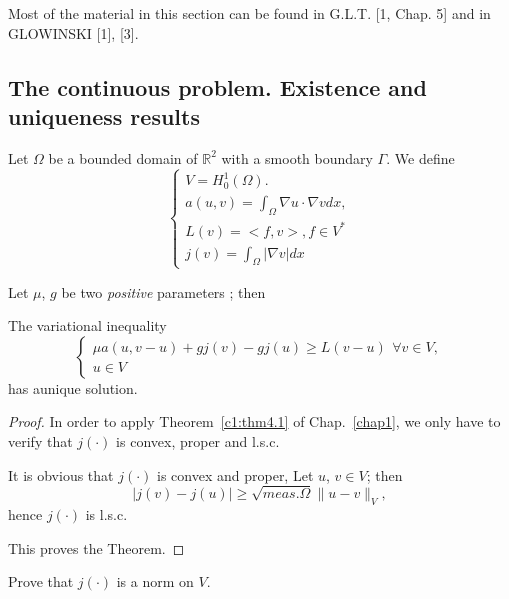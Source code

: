 Most of the material in this section can be found in G.L.T. [1,
  Chap. 5] and in GLOWINSKI [1], [3]. 

\subsection{The continuous problem. Existence and uniqueness
  results}\label{c2:ss6.1}  
Let $\Omega$ be a bounded domain of $\mathbb{R}^2$ with a smooth
boundary $\Gamma$. We define 
\begin{equation*}
\begin{cases}
V= H^1_0 (\Omega ).\\
a(u, v) = \int_\Omega \nabla u \cdot \nabla v dx,\\
L(v) = < f, v>, f \in V^*\\
j(v) = \int_\Omega | \nabla v | dx
\end{cases}
\end{equation*}

Let $\mu$, $g$ be two \textit{ positive } parameters ; then

\begin{theorem}\label{c2:thm6.1}%
The variational inequality
\begin{equation}
\begin{cases}
\mu a( u, v-u) + gj (v) - gj (u) \geq L (v- u) ~\, \forall  v \in
V,\\ 
u \in V
\end{cases}
\tag{6.1}\label{c2:eq6.1}
\end{equation}
 has a\pageoriginale  unique solution.
\end{theorem}

\begin{proof}
In order to apply Theorem~\ref{c1:thm4.1} of Chap.~\ref{chap1}, we only have to verify that
$j (\cdot)$ is convex, proper and l.s.c. 

It is obvious that $j(\cdot)$ is convex and proper, Let $u$, $v \in V$; then 
\begin{equation}
|j (v) - j (u)| \geq \sqrt{meas. \Omega} \parallel  u- v \parallel_V,
\tag{6.2}\label{c2:eq6.2}  
\end{equation}
hence $j (\cdot)$ is l.s.c.

This proves the Theorem. 
\end{proof}

\begin{exercise}\label{c2:exer6.1}%
Prove that $j(\cdot)$ is a norm on $V$.
\end{exercise}

